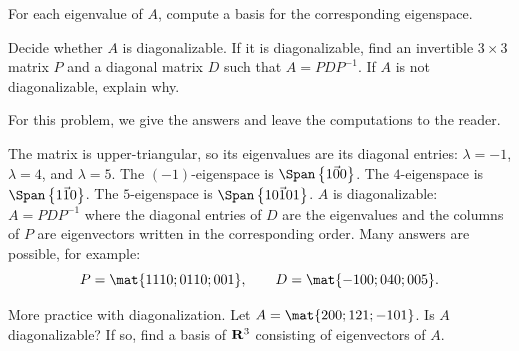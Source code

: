 \begin{problems}
\begin{subproblems}

  \subproblem For each eigenvalue of $A$, compute a basis for the
  corresponding eigenspace.


  \subproblem Decide whether $A$ is diagonalizable. If it is
  diagonalizable, find an invertible $3 \times 3$ matrix $P$ and a
  diagonal matrix $D$ such that $A = PDP^{-1}$. If $A$ is not
  diagonalizable, explain why.
\end{subproblems}
\begin{solution} For this problem, we give the answers and leave the
  computations to the reader.
  \begin{subproblems}
    \subproblem The matrix is upper-triangular, so its eigenvalues are
    its diagonal entries: $\lambda = -1$, $\lambda = 4$, and $\lambda = 5$.
    \subproblem 
    The $(-1)$-eigenspace is $\Span\left\{\vec{1 0 0}\right\}$. \newline  %
    The $4$-eigenspace is $\Span\left\{\vec{1 1 0}\right\}$. \newline %
    The $5$-eigenspace is $\Span\left\{\vec{10 10 1}\right\}$.
    \subproblem $A$ is diagonalizable: $A = PDP^{-1}$ where the diagonal entries
    of $D$ are the eigenvalues and the columns of $P$ are eigenvectors written
    in the corresponding order.  Many answers are possible, for example:
    \[P = \mat{1 1 10; 0 1 10; 0 0 1}, \qquad D = \mat{-1 0 0; 0 4 0; 0 0 5}.\]
  \end{subproblems}
\end{solution}

\problem %
More practice with diagonalization.  \newline \newline %
Let $A = \mat{2 0 0; 1 2 1; -1 0 1}$.  Is $A$ diagonalizable?  If so, find a
basis of ${\bf R}^3$ consisting of eigenvectors of $A$.


\end{problems}
